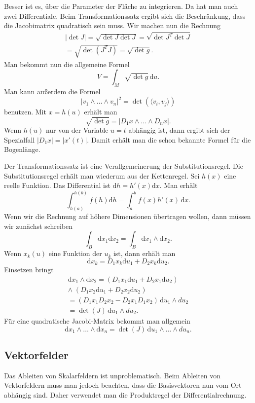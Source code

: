 \documentclass[a4paper,10pt,fleqn,twocolumn,twoside]{article}
\begin{document}
Besser ist es, über die Parameter der Fläche zu integrieren.
Da hat man auch zwei Differentiale. Beim Transformationssatz ergibt
sich die Beschränkung, dass die Jacobimatrix quadratisch sein muss.
Wir machen nun die Rechnung
\begin{gather*}
|{\det J}| = \sqrt{\det J\det J}
= \sqrt{\det J^T\det J}\\
= \sqrt{\det(J^TJ)} = \sqrt{\det g}.
\end{gather*}
Man bekommt nun die allgemeine Formel
\[V = \int_M \sqrt{\det g}\,\mathrm du.\]
Man kann außerdem die Formel
\[|v_1\wedge\ldots\wedge v_n|^2 = \det(\langle v_i,v_j\rangle)\]
benutzen. Mit $x=h(u)$ erhält man
\[\sqrt{\det g} = |D_1 x\wedge\ldots\wedge D_n x|.\]
Wenn $h(u)$ nur von der Variable $u=t$ abhängig ist, dann ergibt
sich der Spezialfall $|D_1 x| = |x'(t)|$. Damit erhält man die schon
bekannte Formel für die Bogenlänge.

Der Transformationssatz ist eine Verallgemeinerung der
Substitutionsregel. Die Substitutionsregel erhält man wiederum aus
der Kettenregel. Sei $h(x)$ eine reelle Funktion.
Das Differential ist $\mathrm dh = h'(x)\mathrm dx$. Man erhält
\[\int_{h(a)}^{h(b)} f(h)\mathrm dh = \int_a^b f(x) h'(x)\,\mathrm dx.\]
Wenn wir die Rechnung auf höhere Dimensionen übertragen wollen, dann
müssen wir zunächst schreiben
\[\int_B \mathrm dx_1\mathrm dx_2 = \int_B \mathrm dx_1\wedge\mathrm dx_2.\]
Wenn $x_k(u)$ eine Funktion der $u_k$ ist, dann erhält man
\[\mathrm dx_k = D_1x_k\mathrm du_1+D_2x_k\mathrm du_2.\]
Einsetzen bringt
\begin{gather*}
\mathrm dx_1\wedge\mathrm dx_2
= (D_1x_1\mathrm du_1+D_2x_1\mathrm du_2)\\
\wedge\; (D_1x_2\mathrm du_1+D_2x_2\mathrm du_2)\\
= (D_1 x_1 D_2 x_2 - D_2 x_1 D_1 x_2)\,\mathrm du_1\wedge du_2\\
= \det(J)\,\mathrm du_1\wedge du_2.
\end{gather*}
Für eine quadratische Jacobi-Matrix bekommt man allgemein
\[\mathrm dx_1\wedge\ldots\wedge\mathrm dx_n
= \det(J)\,\mathrm du_1\wedge\ldots\wedge du_n.\]


\subsection{Vektorfelder}

Das Ableiten von Skalarfeldern ist unproblematisch. Beim Ableiten von
Vektorfeldern muss man jedoch beachten, dass die Basisvektoren nun
vom Ort abhängig sind. Daher verwendet man die Produktregel der
Differentialrechnung.
\end{document}
